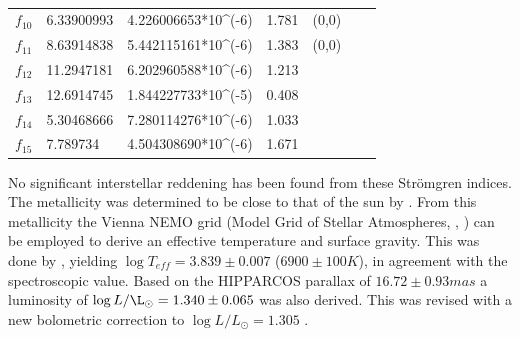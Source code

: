 \begin{table}[htbp]
\begin{tabular}{lllllll}
$f_10$ & 6.33900993              & 4.226006653*10\textasciicircum{}(-6) & 1.781                                                          & (0,0)   &           &                       \\
$f_11$ & 8.63914838              & 5.442115161*10\textasciicircum{}(-6) & 1.383                                                          & (0,0)   &           &                       \\
$f_12$ & 11.2947181              & 6.202960588*10\textasciicircum{}(-6) & 1.213                                                          &         &           &                       \\
$f_13$ & 12.6914745              & 1.844227733*10\textasciicircum{}(-5) & 0.408                                                          &         &           &                       \\
$f_14$ & 5.30468666              & 7.280114276*10\textasciicircum{}(-6) & 1.033                                                          &         &           &                       \\
$f_15$ & 7.789734                & 4.504308690*10\textasciicircum{}(-6) & 1.671                                                          &         &           &                      
\end{tabular}
\caption{}
\label{freqs}
\end{table}



No significant interstellar reddening has been found from these Strömgren indices. The metallicity was determined to be close to that of the sun by \citet{mcnamara1985relations}. From this metallicity the Vienna NEMO grid (Model Grid of Stellar Atmospheres, \citet{nendwich2004interpolation}, \citet{heiter2002new}) can be employed to derive an effective temperature and surface gravity. This was done by \citet{lenz2008asteroseismic}, yielding $ \log T_{eff}= 3.839 \pm 0.007$ ($6900 \pm 100 K$), in agreement with the spectroscopic value. Based on the HIPPARCOS parallax of $16.72\pm 0.93 mas$ a luminosity of $\log L/\L_\odot = 1.340 \pm 0.065$ was also derived. This was revised with a new bolometric correction to $\log L/L_\odot = 1.305$ \citep{lenz2010delta}. 

